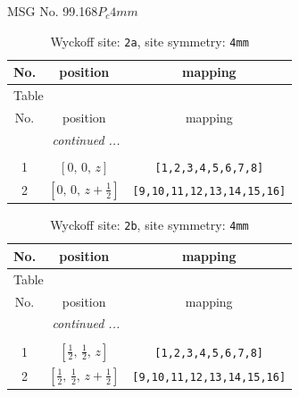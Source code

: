\documentclass[fleqn,8pt]{jsarticle}
\begin{document}
\setcounter{MaxMatrixCols}{32}

\renewcommand{\tablename}{Table~}
\renewcommand{\figurename}{Figure~}
\begin{center}
\LARGE
MSG No. 99.168\quad$P_{c}4mm$
\end{center}
\renewcommand{\arraystretch}{1.2}
\begin{longtable}{ccc}
\caption{Wyckoff site: {\tt 2a}, site symmetry: {\tt 4mm}}
 \\
 \hline \hline
No. & position & mapping \\ \hline \endfirsthead

\multicolumn{2}{l}{\tablename\ \thetable{}} \\
 \hline \hline
No. & position & mapping \\ \hline \endhead

 \hline \hline
\multicolumn{2}{r}{\footnotesize\it continued ...} \\ \endfoot

 \hline \hline
\multicolumn{2}{r}{} \\ \endlastfoot

1 & $\left[ 0,\, 0,\, z \right]$ & {\tt [1,2,3,4,5,6,7,8]} \\ \hline
2 & $\left[ 0,\, 0,\, z + \frac{1}{2} \right]$ & {\tt [9,10,11,12,13,14,15,16]} \\
\end{longtable}
\renewcommand{\arraystretch}{1.2}
\begin{longtable}{ccc}
\caption{Wyckoff site: {\tt 2b}, site symmetry: {\tt 4mm}}
 \\
 \hline \hline
No. & position & mapping \\ \hline \endfirsthead

\multicolumn{2}{l}{\tablename\ \thetable{}} \\
 \hline \hline
No. & position & mapping \\ \hline \endhead

 \hline \hline
\multicolumn{2}{r}{\footnotesize\it continued ...} \\ \endfoot

 \hline \hline
\multicolumn{2}{r}{} \\ \endlastfoot

1 & $\left[ \frac{1}{2},\, \frac{1}{2},\, z \right]$ & {\tt [1,2,3,4,5,6,7,8]} \\ \hline
2 & $\left[ \frac{1}{2},\, \frac{1}{2},\, z + \frac{1}{2} \right]$ & {\tt [9,10,11,12,13,14,15,16]} \\
\end{longtable}
\end{document}
